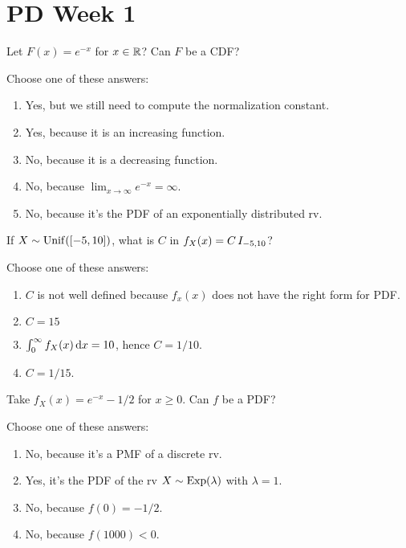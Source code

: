 \documentclass[poll_tutorial_format]{subfiles}
\begin{document}
\maketitle

\section{PD Week 1}

\begin{exercise}
Let $F(x) = e^{-x}$ for $x\in \mathbb{R}$? Can $F$ be a CDF?

Choose one of these answers:
\begin{enumerate}
\item Yes, but we still need to compute the normalization constant.
\item Yes, because it is an increasing function.
\item No, because it is a decreasing function.
\item No, because $\lim_{x\to\infty} e^{-x}=\infty$.
\item No, because it's the PDF of an exponentially distributed rv.
\end{enumerate}
\end{exercise}


\begin{exercise}
If $X\sim  \mathrm{Unif}([-5, 10])$, what is $C$ in $f_{X}(x) = C \,I_{-5, 10}$?

Choose one of these answers:
\begin{enumerate}
\item $C$ is not well defined because $f_{x}(x)$ does not have the right form for PDF.
\item $C=15$
\item $\int_0^{\infty} f_{X}(x) \,\textrm{d}x = 10$, hence $C=1/10$.
\item $C=1/15$.
\end{enumerate}
\end{exercise}

\begin{exercise}
Take $f_X(x) = e^{-x}-1/2$ for $x\geq 0$.  Can $f$ be a PDF?

Choose one of these answers:
\begin{enumerate}
\item No, because it's a PMF of a discrete rv.
\item Yes, it's the PDF of the rv $X\sim\mathrm{Exp}(\lambda)$ with $\lambda = 1$.
\item No, because $f(0)  = -1/2$.
\item No, because $f(1000) < 0$.
\end{enumerate}
\end{exercise}
\end{document}
